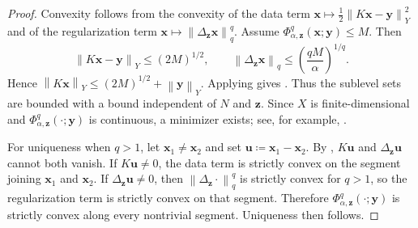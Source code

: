 \documentclass{article}
\theoremstyle{remark}
\newcommand{\norm}[1]{\left\lVert #1 \right\rVert}
\newcommand{\bx}{{\bm{x}}}
\newcommand{\by}{{\bm{y}}}
\newcommand{\bz}{{\bm{z}}}
\newcommand{\bu}{{\bm{u}}}
\begin{document}
\begin{proof}
Convexity follows from the convexity of the data term $\bx \mapsto \frac12\norm{K\bx - \by}_Y^2$ and of the regularization term
$\bx\mapsto\norm{\Delta_\bz \bx}_q^q$. Assume $\Phi_{\alpha,\bz}^q(\bx;\by)\le M$. Then
\[
\norm{K\bx-\by}_Y\le (2M)^{1/2},
\qquad
\norm{\Delta_\bz \bx}_q\le \left(\frac{qM}{\alpha}\right)^{1/q}.
\]
Hence $\norm{K\bx}_Y\le (2M)^{1/2}+\norm{\by}_Y$. Applying
 gives . Thus the sublevel
sets are bounded with a bound independent of $N$ and $\bz$. Since $X$ is
finite-dimensional and $\Phi_{\alpha,\bz}^q(\cdot;\by)$ is continuous, a
minimizer exists; see, for example, \cite[Proposition 11.15]{bauschke2017convex}.

For uniqueness when $q>1$, let $\bx_1\ne\bx_2$ and set
$\bu\coloneqq\bx_1-\bx_2$. By , $K\bu$ and
$\Delta_\bz\bu$ cannot both vanish. If $K\bu\ne0$, the data term is strictly
convex on the segment joining $\bx_1$ and $\bx_2$. If $\Delta_\bz\bu\ne0$, then
$\norm{\Delta_\bz \cdot}_q^q$ is strictly convex for $q>1$, so the regularization term is
strictly convex on that segment. Therefore
$\Phi_{\alpha,\bz}^q(\cdot;\by)$ is strictly convex along every nontrivial
segment. Uniqueness then follows.
\end{proof}
\end{document}
